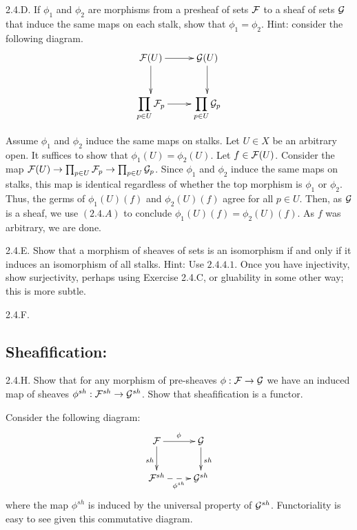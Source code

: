 \begin{exercise}{2.4.D.} 
    If $\phi_1$ and $\phi_2$ are morphisms from a presheaf of sets $\mathcal{F}$
    to a sheaf of sets $\mathcal{G}$ that induce the same maps on each stalk,
    show that $\phi_1 = \phi_2$. Hint: consider the following diagram.
    \[ \xymatrix{
    \FF(U) \ar[r] \ar[d] &
    \GG(U) \ar[d] \\
    \displaystyle\prod_{p \in U} \FF_p \ar[r] &
    \displaystyle\prod_{p \in U} \GG_p} \]
\end{exercise}
\begin{solution}
    Assume $\phi_1$ and $\phi_2$ induce the same maps on stalks. Let $U \in X$ be an arbitrary open. It suffices to show that $\phi_1(U) = \phi_2(U)$. Let $f \in \mathcal{F}(U)$. Consider the map $\mathcal{F}(U) \to \prod_{p\in U} \mathcal{F}_p \to \prod_{p \in U} \mathcal{G}_p$. Since $\phi_1$ and $\phi_2$ induce the same maps on stalks, this map is identical regardless of whether the top morphism is $\phi_1$ or $\phi_2$. Thus, the germs of $\phi_1(U)(f)$ and $\phi_2(U)(f)$ agree for all $p \in U$. Then, as $\mathcal{G}$ is a sheaf, we use $(2.4.A)$ to conclude $\phi_1(U)(f) = \phi_2(U)(f)$. As $f$ was arbitrary, we are done. 
\end{solution}

\begin{exercise}{2.4.E.} 
Show that a morphism of sheaves of sets is an isomorphism if and only if
it induces an isomorphism of all stalks.
Hint: Use $2.4.4.1$. Once you have injectivity, show
surjectivity, perhaps using Exercise 2.4.C, or gluability in some other
way; this is more subtle.
\end{exercise}
\begin{solution}
     \todo{}
\end{solution}

\begin{exercise}{2.4.F.} 

\end{exercise}
\begin{solution}
    \todo{}

\end{solution}

\subsection{Sheafification:}
\begin{exercise}{2.4.H.} 
    Show that for any morphism of pre-sheaves $\phi: \mathcal{F} \to \mathcal{G}$ we have an induced map of sheaves $\phi^{sh}: \mathcal{F}^{sh} \to \mathcal{G}^{sh}$. Show that sheafification is a functor. 
\end{exercise}
\begin{solution}
    Consider the following diagram: 
    \[ \xymatrix{ \FF \ar[r]^{\phi} \ar[d]_{sh} & \GG \ar[d]^{sh} \\
    \FF^{sh} \ar@{-->}[r]_{\phi^{sh}} & \GG^{sh} }\]
    where the map $\phi^{sh}$ is induced by the universal property of $\mathcal{G}^{sh}$. Functoriality is easy to see given this commutative diagram.
\end{solution}

